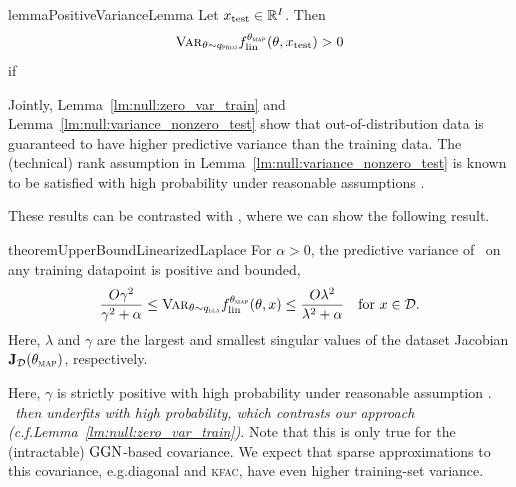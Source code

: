 \begin{restatable}{lemma}{PositiveVarianceLemma}
  \label{lm:null:variance_nonzero_test}
    Let $x_{\textnormal{test}} \in \mathbb{R}^I$. Then
    \begin{equation}
    \label{eq:null:variance_nonzero_test}
        \textnormal{\textsc{Var}}_{\theta \sim q_{\textnormal{\textsc{proj}}}} f_{\mathrm{lin}}^{\theta_{\textsc{map}}}(\theta, x_{\textnormal{test}}) > 0
    \end{equation}
    if
\end{restatable}

Jointly, Lemma~\ref{lm:null:zero_var_train} and Lemma~\ref{lm:null:variance_nonzero_test} show that out-of-distribution data is guaranteed to have higher predictive variance than the training data. The (technical) rank assumption in Lemma~\ref{lm:null:variance_nonzero_test} is known to be satisfied with high probability under reasonable assumptions \citep{bombari2022memorization, nguyen2021tight, karhadkar2024bounds}. 

These results can be contrasted with \LLA, where we can show the following result.
\begin{restatable}{theorem}{UpperBoundLinearizedLaplace}
\label{thm:null:upper_bound_lla}
    For $\alpha>0$, the predictive variance of \LLA\ on any training datapoint is positive and bounded,
    \begin{equation*}
        \frac{O \gamma^2}{\gamma^2 + \alpha}
        \leq
        \textnormal{\textsc{Var}}_{\theta\sim q_{\textnormal{\textsc{lla}}}} f_{\mathrm{lin}}^{\theta_{\textsc{map}}}(\theta, x)
        \leq
        \frac{O \lambda^2}{\lambda^2 + \alpha}
        \quad \text{for } x \in \mathcal{D}.
    \end{equation*}
    Here, $\lambda$ and $\gamma$ are the largest and smallest singular values of the dataset Jacobian $\mathbf{J}_{\mathcal D}(\theta_{\textsc{map}})$, respectively.
\end{restatable}
Here, $\gamma$ is strictly positive with high probability under reasonable assumption \citep{bombari2022memorization, nguyen2021tight, karhadkar2024bounds}. \emph{\LLA\ then underfits with high probability, which contrasts our approach (c.f.\@ Lemma~\ref{lm:null:zero_var_train})}.
Note that this is only true for the (intractable) $\mathrm{GGN}$-based covariance. We expect that sparse approximations to this covariance, e.g.\@ diagonal and \textsc{kfac}, have even higher training-set variance.

